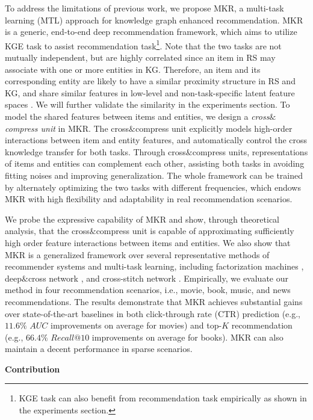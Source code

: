 \documentclass[sigconf]{acmart}
\begin{document}
	To address the limitations of previous work, we propose MKR, a multi-task learning (MTL) approach for knowledge graph enhanced recommendation.
	MKR is a generic, end-to-end deep recommendation framework, which aims to utilize KGE task to assist recommendation task\footnote{KGE task can also benefit from recommendation task empirically as shown in the experiments section.}.
	Note that the two tasks are not mutually independent, but are highly correlated since an item in RS may associate with one or more entities in KG.
	Therefore, an item and its corresponding entity are likely to have a similar proximity structure in RS and KG, and share similar features in low-level and non-task-specific latent feature spaces \cite{long2017learning}.
	We will further validate the similarity in the experiments section.
	To model the shared features between items and entities, we design a \textit{cross$\&$compress unit} in MKR.
	The cross$\&$compress unit explicitly models high-order interactions between item and entity features, and automatically control the cross knowledge transfer for both tasks.
	Through cross$\&$compress units, representations of items and entities can complement each other, assisting both tasks in avoiding fitting noises and improving generalization.
	The whole framework can be trained by alternately optimizing the two tasks with different
frequencies, which endows MKR with high flexibility and adaptability in real recommendation scenarios.
	
	We probe the expressive capability of MKR and show, through theoretical analysis, that the cross$\&$compress unit is capable of approximating sufficiently high order feature interactions between items and entities.
	We also show that MKR is a generalized framework over several representative methods of recommender systems and multi-task learning, including factorization machines \cite{rendle2010factorization, rendle2012factorization}, deep$\&$cross network \cite{wang2017deep}, and cross-stitch network \cite{misra2016cross}.
	Empirically, we evaluate our method in four recommendation scenarios, i.e., movie, book, music, and news recommendations.
	The results demonstrate that MKR achieves substantial gains over state-of-the-art baselines in both click-through rate (CTR) prediction (e.g., $11.6\%$ $AUC$ improvements on average for movies) and top-$K$ recommendation (e.g., $66.4\%$ $Recall@10$ improvements on average for books).
	MKR can also maintain a decent performance in sparse scenarios.
	
	\vspace{0.5em}
	\noindent\textbf{Contribution}		
	
\end{document}
